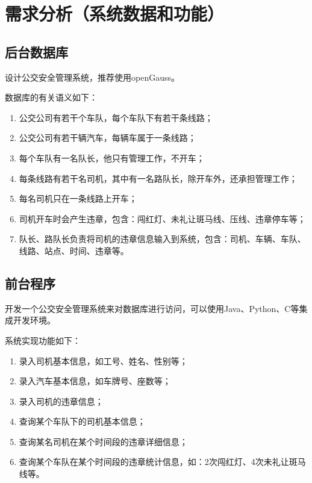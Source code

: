 \documentclass {article}
\begin{document}
	\maketitle{}
	\section{需求分析（系统数据和功能）}
		\subsection{后台数据库}
			设计公交安全管理系统，推荐使用openGauss。    
			
			数据库的有关语义如下：
			\begin{enumerate}
				\item 公交公司有若干个车队，每个车队下有若干条线路；
				\item 公交公司有若干辆汽车，每辆车属于一条线路；
				\item 每个车队有一名队长，他只有管理工作，不开车；
				\item 每条线路有若干名司机，其中有一名路队长，除开车外，还承担管理工作；
				\item 每名司机只在一条线路上开车；
				\item 司机开车时会产生违章，包含：闯红灯、未礼让斑马线、压线、违章停车等；
				\item 队长、路队长负责将司机的违章信息输入到系统，包含：司机、车辆、车队、线路、站点、时间、违章等。
			\end{enumerate}
			
		\subsection{前台程序}
			开发一个公交安全管理系统来对数据库进行访问，可以使用Java、Python、C等集成开发环境。    
			
			系统实现功能如下：
			\begin{enumerate}
				\item 录入司机基本信息，如工号、姓名、性别等；
				\item 录入汽车基本信息，如车牌号、座数等；
				\item 录入司机的违章信息；
				\item 查询某个车队下的司机基本信息；
				\item 查询某名司机在某个时间段的违章详细信息；
				\item 查询某个车队在某个时间段的违章统计信息，如：2次闯红灯、4次未礼让斑马线等。
			\end{enumerate}
			
\end{document}
